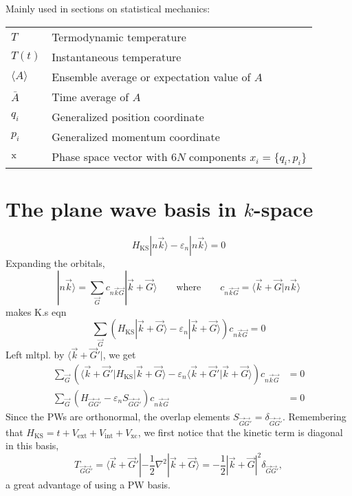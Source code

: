\documentclass[11pt,bibliography=totoc,index=totoc]{scrbook}   %
\begin{document}
  Mainly used in sections on statistical mechanics:
  
  \begin{tabular}{ll}
    $T$     & Termodynamic temperature \\
    $T(t)$  & Instantaneous temperature \\
    $\langle A \rangle$ & Ensemble average or expectation value of $A$\\
    $\bar{A}$ & Time average of $A$ \\
    $q_i$   & Generalized position coordinate \\
    $p_i$   & Generalized momentum coordinate \\
    $\mathrm{x}$ & Phase space vector with $6N$ components $x_i=\{q_i,p_i\}$
  \end{tabular}

\chapter{The plane wave basis in $k$-space}\label{app:pwbasis}

\begin{equation}
    H_{\text{KS}} |n\vec{k}\rangle - \varepsilon_n|n\vec{k}\rangle = 0
\end{equation}
Expanding the orbitals,
\begin{equation}
    |n\vec{k}\rangle = \sum_{\vec{G}} c_{n\vec{k}\vec{G}} |\vec{k}+\vec{G}\rangle\qquad\text{where}\qquad c_{n\vec{k}\vec{G}} = \langle \vec{k}+\vec{G}|n\vec{k}\rangle
\end{equation}
makes K.s eqn
\begin{equation}
  \sum_{\vec{G}} \left(H_{\text{KS}} |\vec{k}+\vec{G}\rangle - \varepsilon_n |\vec{k}+\vec{G}\rangle \right) c_{n\vec{k}\vec{G}} = 0
\end{equation}
Left mltpl. by $\langle \vec{k}+\vec{G}'|$, we get
\begin{align}
    \sum_{\vec{G}} \left( \langle \vec{k}+\vec{G}'| H_{\text{KS}} |\vec{k}+\vec{G}\rangle - \varepsilon_n \langle \vec{k}+\vec{G}'|\vec{k}+\vec{G}\rangle \right)c_{n\vec{k}\vec{G}} &= 0 \\
    \sum_{\vec{G}} \left( H_{\vec{G}\vec{G}'} - \varepsilon_n S_{\vec{G}\vec{G}'} \right)c_{n\vec{k}\vec{G}} &= 0
\end{align}
Since the PWs are orthonormal, the overlap elements $S_{\vec{G}\vec{G}'} = \delta_{\vec{G}\vec{G}'}$.
Remembering that $H_{\text{KS}} = t + V_{\text{ext}} + V_{\text{int}} + V_{\text{xc}}$,
we first notice that the kinetic term is diagonal in this basis,
\begin{equation}
    T_{\vec{G}\vec{G}'} = \langle \vec{k}+\vec{G}'| -\frac12\nabla^2 |\vec{k}+\vec{G}\rangle = -\frac12|\vec{k}+\vec{G}|^2 \delta_{\vec{G}\vec{G}'},
\end{equation}
a great advantage of using a PW basis.
\end{document}
